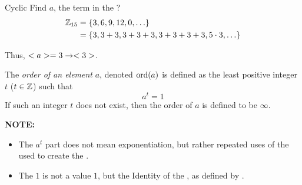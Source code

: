 \begin{example}[]{Cyclic}
  Find $a$, the  term in the  ?
  \tcblower{}
  \begin{equation*}
    \begin{aligned}
      \operatorname{\mathbb{Z}}_{15} &= \lbrace 3, 6, 9, 12, 0, \ldots \rbrace \\
      &= \lbrace 3, 3+3, 3+3+3, 3+3+3+3, 5 \cdot 3, \ldots \rbrace \\
    \end{aligned}
  \end{equation*}

  Thus, $<a> = 3 \rightarrow <3>$.
\end{example}

\begin{definition}\label{def:Element_in_Group_Order}
  The \emph{order of an element} $a$, denoted $\operatorname{\text{ord}}(a)$ is defined as the least positive integer $t$ ($t \in \operatorname{\mathbb{Z}}$) such that
  \begin{equation}\label{eq:Element_in_Group_Order}
    a^{t} = 1
  \end{equation}
  If such an integer $t$ does not exist, then the order of $a$ is defined to be $\infty$.

  \begin{remark}\label{rmk:Element_in_Group_Order_Term_Explanation}
    \textbf{NOTE:}
    \begin{itemize}[noitemsep]
    \item The $a^{t}$ part does not mean exponentiation, but rather repeated uses of the  used to create the .
    \item The $1$ is not a value $1$, but the Identity of the , as defined by .
    \end{itemize}
  \end{remark}
\end{definition}

